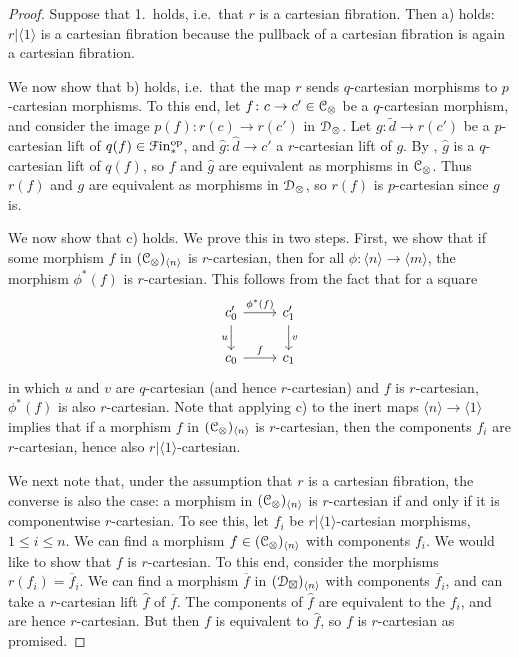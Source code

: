 \documentclass[main.tex]{subfiles}
\begin{document}
\begin{proof}
  Suppose that 1.\ holds, i.e.\ that $r$ is a cartesian fibration. Then a) holds: $r|\langle 1 \rangle$ is a cartesian fibration because the pullback of a cartesian fibration is again a cartesian fibration. 

  We now show that b) holds, i.e.\ that the map $r$ sends $q$-cartesian morphisms to $p$-cartesian morphisms. To this end, let $f\colon c \to c' \in \mathcal{C}_{\otimes}$ be a $q$-cartesian morphism, and consider the image $p(f)\colon r(c) \to r(c')$ in $\mathcal{D}_{\otimes}$. Let $g\colon \tilde{d} \to r(c')$ be a $p$-cartesian lift of $q(f) \in \mathcal{F}\mathrm{in}_{*}^{\mathrm{op}}$, and $\hat{g}\colon \hat{d} \to c'$ a $r$-cartesian lift of $g$. By \cite[Prop.~2.4.1.3]{highertopostheory}, $\hat{g}$ is a $q$-cartesian lift of $q(f)$, so $f$ and $\hat{g}$ are equivalent as morphisms in $\mathcal{C}_{\otimes}$. Thus $r(f)$ and $g$ are equivalent as morphisms in $\mathcal{D}_{\otimes}$, so $r(f)$ is $p$-cartesian since $g$ is.

  We now show that c) holds. We prove this in two steps. First, we show that if some morphism $f$ in $(\mathcal{C}_{\otimes})_{\langle n \rangle}$ is $r$-cartesian, then for all $\phi\colon \langle n \rangle \to \langle m \rangle$, the morphism $\phi^{*}(f)$ is $r$-cartesian. This follows from the fact that for a square
  \begin{equation*}
    \begin{tikzcd}
      c_{0}'
      \arrow[r, "\phi^{*}(f)"]
      \arrow[d, swap, "u"]
      & c_{1}'
      \arrow[d, "v"]
      \\
      c_{0}
      \arrow[r, "f"]
      & c_{1}
    \end{tikzcd}
  \end{equation*}
  in which $u$ and $v$ are $q$-cartesian (and hence $r$-cartesian) and $f$ is $r$-cartesian, $\phi^{*}(f)$ is also $r$-cartesian. Note that applying c) to the inert maps $\langle n \rangle \to \langle 1 \rangle$ implies that if a morphism $f$ in $(\mathcal{C}_{\otimes})_{\langle n \rangle}$ is $r$-cartesian, then the components $f_{i}$ are $r$-cartesian, hence also $r|\langle 1 \rangle$-cartesian.

  We next note that, under the assumption that $r$ is a cartesian fibration, the converse is also the case: a morphism in $(\mathcal{C}_{\otimes})_{\langle n \rangle}$ is $r$-cartesian if and only if it is componentwise $r$-cartesian. To see this, let $f_{i}$ be $r|\langle 1 \rangle$-cartesian morphisms, $1 \leq i \leq n$. We can find a morphism $f \in (\mathcal{C}_{\otimes})_{\langle n \rangle}$ with components $f_{i}$. We would like to show that $f$ is $r$-cartesian. To this end, consider the morphisms $r(f_{i}) = \overline{f}_{i}$. We can find a morphism $\overline{f}$ in $(\mathcal{D}_{\boxtimes})_{\langle n \rangle}$ with components $\overline{f}_{i}$, and can take a $r$-cartesian lift $\hat{f}$ of $\overline{f}$. The components of $\hat{f}$ are equivalent to the $f_{i}$, and are hence $r$-cartesian. But then $f$ is equivalent to $\hat{f}$, so $f$ is $r$-cartesian as promised. 


\end{proof}
\end{document}
